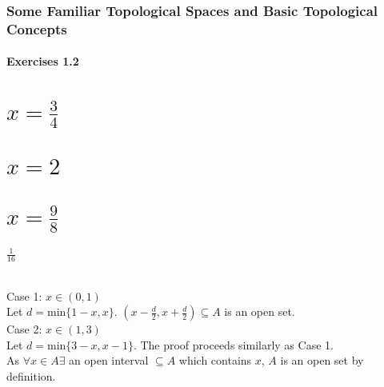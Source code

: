 \section{Some Familiar Topological Spaces and Basic Topological Concepts}

\subsection{Exercises 1.2}
\setcounter{question}{0}



\begin{parts}
 
 \part{$x = \frac{3}{4}$}
 \part{$x = 2$}
 \part{$x = \frac{9}{8}$}
 
\begin{solution}
 $\frac{1}{16}$
\end{solution}

\end{parts}


\begin{solution}
\\Case 1: $x \in (0,1)$ \\
Let $d = \text{min}\{1-x,x\}$. $(x-\frac{d}{2},x+\frac{d}{2}) \subseteq A$ is an open set. \\
Case 2: $x \in (1,3)$ \\
Let $d = \text{min}\{3-x,x-1\}$. The proof proceeds similarly as Case 1. \\
As $\forall x \in A \exists$ an open interval $\subseteq A$ which contains $x$, $A$ is an open set by definition.
\end{solution}


